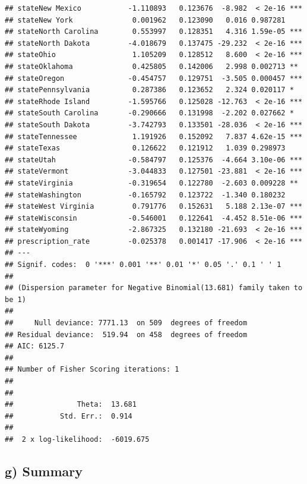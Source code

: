 \documentclass[]{article}
\begin{document}
\begin{verbatim}
## stateNew Mexico           -1.110893   0.123676  -8.982  < 2e-16 ***
## stateNew York              0.001962   0.123090   0.016 0.987281    
## stateNorth Carolina        0.553997   0.128351   4.316 1.59e-05 ***
## stateNorth Dakota         -4.018679   0.137475 -29.232  < 2e-16 ***
## stateOhio                  1.105209   0.128512   8.600  < 2e-16 ***
## stateOklahoma              0.425805   0.142006   2.998 0.002713 ** 
## stateOregon               -0.454757   0.129751  -3.505 0.000457 ***
## statePennsylvania          0.287386   0.123652   2.324 0.020117 *  
## stateRhode Island         -1.595766   0.125028 -12.763  < 2e-16 ***
## stateSouth Carolina       -0.290666   0.131998  -2.202 0.027662 *  
## stateSouth Dakota         -3.742793   0.133501 -28.036  < 2e-16 ***
## stateTennessee             1.191926   0.152092   7.837 4.62e-15 ***
## stateTexas                 0.126622   0.121912   1.039 0.298973    
## stateUtah                 -0.584797   0.125376  -4.664 3.10e-06 ***
## stateVermont              -3.044833   0.127501 -23.881  < 2e-16 ***
## stateVirginia             -0.319654   0.122780  -2.603 0.009228 ** 
## stateWashington           -0.165792   0.123722  -1.340 0.180232    
## stateWest Virginia         0.791776   0.152631   5.188 2.13e-07 ***
## stateWisconsin            -0.546001   0.122641  -4.452 8.51e-06 ***
## stateWyoming              -2.867325   0.132180 -21.693  < 2e-16 ***
## prescription_rate         -0.025378   0.001417 -17.906  < 2e-16 ***
## ---
## Signif. codes:  0 '***' 0.001 '**' 0.01 '*' 0.05 '.' 0.1 ' ' 1
## 
## (Dispersion parameter for Negative Binomial(13.681) family taken to be 1)
## 
##     Null deviance: 7771.13  on 509  degrees of freedom
## Residual deviance:  519.94  on 458  degrees of freedom
## AIC: 6125.7
## 
## Number of Fisher Scoring iterations: 1
## 
## 
##               Theta:  13.681 
##           Std. Err.:  0.914 
## 
##  2 x log-likelihood:  -6019.675
\end{verbatim}

\hypertarget{g-summary}{%
\subsection{g) Summary}\label{g-summary}}
\end{document}

